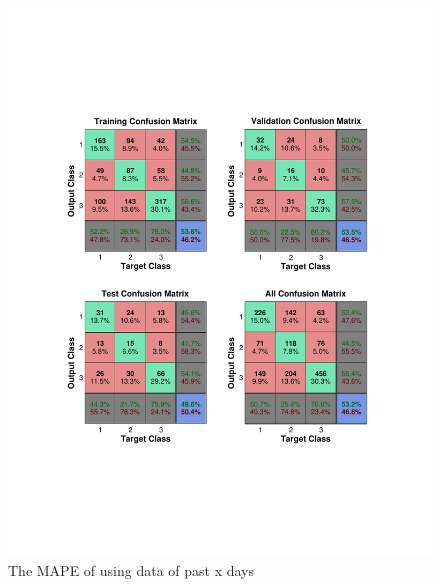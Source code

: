 \documentclass{sig-alternate}
\begin{document}
\begin{figure}[ht]
\centering
\includegraphics[scale = 0.4, trim = 300 150 300 150]{pic/cl1.pdf}
\caption{The MAPE of using data of past x days}
\end{figure}
\end{document}
